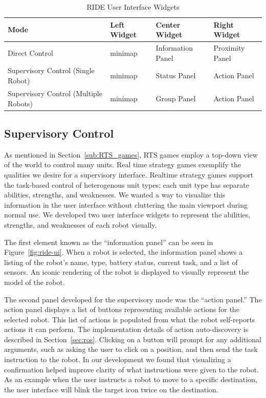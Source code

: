 \begin{table}[ht]
\label{tab:ui-widgets}
\begin{center}
    \begin{tabular}{ | p{4cm} | l | l | l |}
    \hline
    \textbf{Mode} & \textbf{Left Widget} & \textbf{Center Widget} & \textbf{Right Widget} \\ \hline
    Direct Control & minimap & Information Panel & Proximity Panel \\ \hline
    Supervisory Control (Single Robot) & minimap & Status Panel & Action Panel \\ \hline
    Supervisory Control (Multiple Robots) & minimap & Group Panel & Action Panel \\ \hline
    \hline
    \end{tabular}
    \caption{RIDE User Interface Widgets}
\end{center}
\end{table}

\subsection{Supervisory Control}
\label{subs:ui-supervisor}

As mentioned in Section~\ref{sub:RTS_games}, RTS games employ a top-down view of the world to control many units. Real time strategy games exemplify the qualities we desire for a supervisory interface. Realtime strategy games support the task-based control of heterogenous unit types; each unit type has separate abilities, strengths, and weaknesses. We wanted a way to visualize this information in the user interface without cluttering the main viewport during normal use. We developed two user interface widgets to represent the abilities, strengths, and weaknesses of each robot visually.

The first element known as the ``information panel'' can be seen in Figure~\ref{fig:ride-ui}. When a robot is selected, the information panel shows a listing of the robot's name, type, battery status, current task, and a list of sensors. An iconic rendering of the robot is displayed to visually represent the model of the robot.

The second panel developed for the supervisory mode was the ``action panel.'' The action panel displays a list of buttons representing available actions for the selected robot. This list of actions is populated from what the robot self-reports actions it can perform. The implementation details of action auto-discovery is described in Section~\ref{sec:ros}. Clicking on a button will prompt for any additional arguments, such as asking the user to click on a position, and then send the task instruction to the robot. In our development we found that visualizing a confirmation helped improve clarity of what instructions were given to the robot. As an example when the user instructs a robot to move to a specific destination, the user interface will blink the target icon twice on the destination.  

